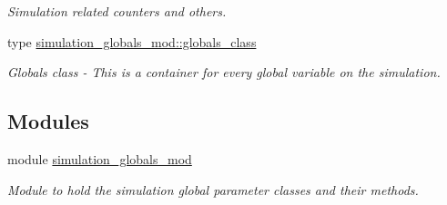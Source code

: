 \begin{DoxyCompactItemize}
\begin{DoxyCompactList}\small\item\em Simulation related counters and others. \end{DoxyCompactList}\item 
type \mbox{\hyperlink{structsimulation__globals__mod_1_1globals__class}{simulation\+\_\+globals\+\_\+mod\+::globals\+\_\+class}}
\begin{DoxyCompactList}\small\item\em Globals class -\/ This is a container for every global variable on the simulation. \end{DoxyCompactList}\end{DoxyCompactItemize}
\subsection*{Modules}
\begin{DoxyCompactItemize}
\item 
module \mbox{\hyperlink{namespacesimulation__globals__mod}{simulation\+\_\+globals\+\_\+mod}}
\begin{DoxyCompactList}\small\item\em Module to hold the simulation global parameter classes and their methods. \end{DoxyCompactList}\end{DoxyCompactItemize}
